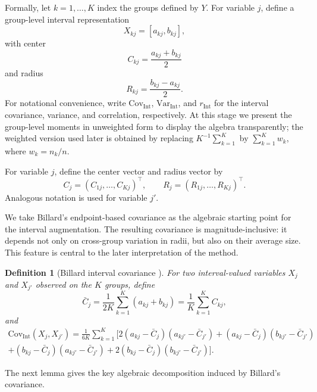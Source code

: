 \documentclass[preprint, times, 12pt, authoryear]{elsarticle}
\newtheorem{definition}{Definition}
\begin{document}
Formally, let $k=1,\ldots,K$ index the groups defined by $Y$. For variable $j$, define a group-level interval representation
\[
X_{kj}=[a_{kj},b_{kj}],
\]
with center
\[
C_{kj}=\frac{a_{kj}+b_{kj}}{2}
\]
and radius
\[
R_{kj}=\frac{b_{kj}-a_{kj}}{2}.
\]
For notational convenience, write $\mathrm{Cov}_{\mathrm{Int}}$, $\mathrm{Var}_{\mathrm{Int}}$, and $r_{\mathrm{Int}}$ for the interval covariance, variance, and correlation, respectively. At this stage we present the group-level moments in unweighted form to display the algebra transparently; the weighted version used later is obtained by replacing $K^{-1}\sum_{k=1}^K$ by $\sum_{k=1}^K w_k$, where $w_k=n_k/n$.

For variable $j$, define the center vector and radius vector by
\[
C_j=(C_{1j},\ldots,C_{Kj})^\top,
\qquad
R_j=(R_{1j},\ldots,R_{Kj})^\top.
\]
Analogous notation is used for variable $j'$.

We take Billard's endpoint-based covariance as the algebraic starting point for the interval augmentation. The resulting covariance is magnitude-inclusive: it depends not only on cross-group variation in radii, but also on their average size. This feature is central to the later interpretation of the method.

\begin{definition}[Billard interval covariance \citep{billard2007dependencies,billard2008sample}]\label{def:billard_cov}
	For two interval-valued variables $X_j$ and $X_{j'}$ observed on the $K$ groups, define
	\begin{equation}\label{eq:xi_mean}
		\bar C_j
		=
		\frac{1}{2K}\sum_{k=1}^K(a_{kj}+b_{kj})
		=
		\frac{1}{K}\sum_{k=1}^K C_{kj},
	\end{equation}
	and
	\begin{multline}\label{eq:int_billard}
		\mathrm{Cov}_{\mathrm{Int}}(X_j,X_{j'})
		=
		\frac{1}{6K}\sum_{k=1}^K
		\Big[
		2(a_{kj}-\bar C_j)(a_{kj'}-\bar C_{j'})+
		(a_{kj}-\bar C_j)(b_{kj'}-\bar C_{j'}) \\+
		(b_{kj}-\bar C_j)(a_{kj'}-\bar C_{j'})+
		2(b_{kj}-\bar C_j)(b_{kj'}-\bar C_{j'})
		\Big].
	\end{multline}
\end{definition}

The next lemma gives the key algebraic decomposition induced by Billard's covariance.
\end{document}

